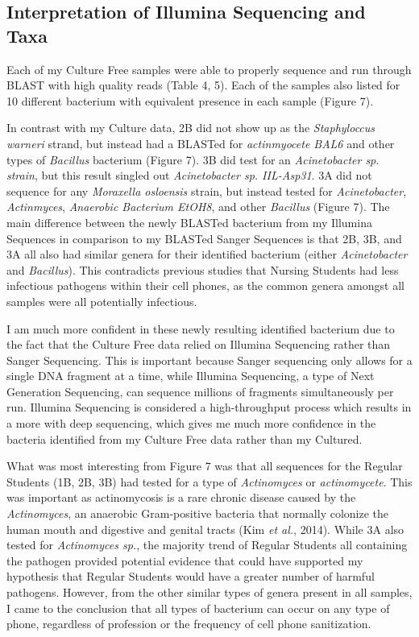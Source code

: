 \documentclass[]{article}
\begin{document}
\hypertarget{interpretation-of-illumina-sequencing-and-taxa}{%
\subsection{Interpretation of Illumina Sequencing and
Taxa}\label{interpretation-of-illumina-sequencing-and-taxa}}

Each of my Culture Free samples were able to properly sequence and run
through BLAST with high quality reads (Table 4, 5). Each of the samples
also listed for 10 different bacterium with equivalent presence in each
sample (Figure 7).

In contrast with my Culture data, 2B did not show up as the
\emph{Staphyloccus warneri} strand, but instead had a BLASTed for
\emph{actinmyocete BAL6} and other types of \emph{Bacillus} bacterium
(Figure 7). 3B did test for an \emph{Acinetobacter sp. strain}, but this
result singled out \emph{Acinetobacter sp. IIL-Asp31}. 3A did not
sequence for any \emph{Moraxella osloensis} strain, but instead tested
for \emph{Acinetobacter}, \emph{Actinmyces}, \emph{Anaerobic Bacterium
EtOH8}, and other \emph{Bacillus} (Figure 7). The main difference
between the newly BLASTed bacterium from my Illumina Sequences in
comparison to my BLASTed Sanger Sequences is that 2B, 3B, and 3A all
also had similar genera for their identified bacterium (either
\emph{Acinetobacter} and \emph{Bacillus}). This contradicts previous
studies that Nursing Students had less infectious pathogens within their
cell phones, as the common genera amongst all samples were all
potentially infectious.

I am much more confident in these newly resulting identified bacterium
due to the fact that the Culture Free data relied on Illumina Sequencing
rather than Sanger Sequencing. This is important because Sanger
sequencing only allows for a single DNA fragment at a time, while
Illumina Sequencing, a type of Next Generation Sequencing, can sequence
millions of fragments simultaneously per run. Illumina Sequencing is
considered a high-throughput process which results in a more with deep
sequencing, which gives me much more confidence in the bacteria
identified from my Culture Free data rather than my Cultured.

What was most interesting from Figure 7 was that all sequences for the
Regular Students (1B, 2B, 3B) had tested for a type of
\emph{Actinomyces} or \emph{actinomycete}. This was important as
actinomycosis is a rare chronic disease caused by the
\emph{Actinomyces}, an anaerobic Gram-positive bacteria that normally
colonize the human mouth and digestive and genital tracts (Kim \emph{et
al.}, 2014). While 3A also tested for \emph{Actinomyces sp.}, the
majority trend of Regular Students all containing the pathogen provided
potential evidence that could have supported my hypothesis that Regular
Students would have a greater number of harmful pathogens. However, from
the other similar types of genera present in all samples, I came to the
conclusion that all types of bacterium can occur on any type of phone,
regardless of profession or the frequency of cell phone sanitization.
\end{document}

